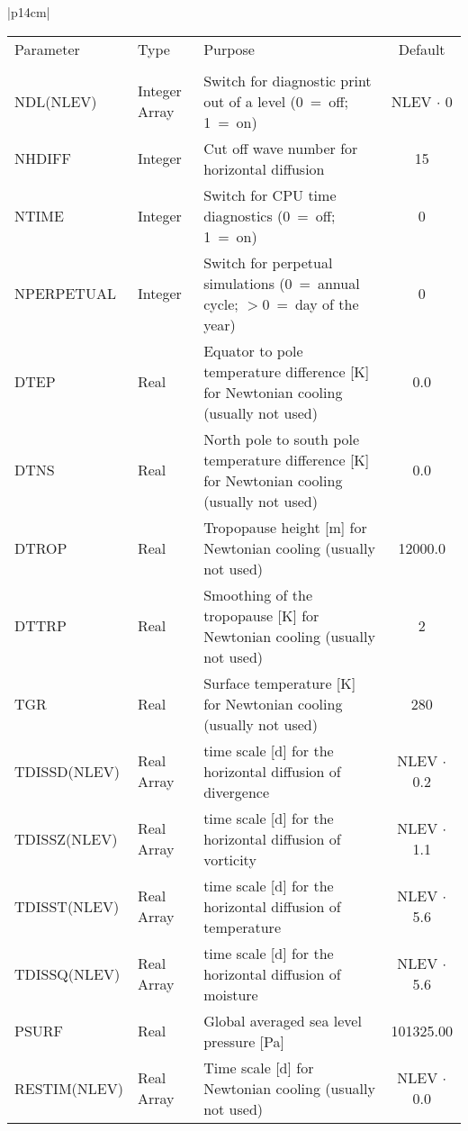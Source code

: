 \newpage 

\begin{center}
\begin{tabular}{|p{14cm}|}
\begin{center}
\begin{tabular}{l l p{5cm} c} %
Parameter & Type & Purpose & Default \\
&&&\\
NDL(NLEV) & Integer Array & Switch for diagnostic print out of a level (0~=~off; 1~=~on)
& NLEV $\cdot$ 0 \\
NHDIFF & Integer & Cut off wave number for horizontal diffusion &  15 \\
NTIME & Integer & Switch for CPU time diagnostics (0~=~off; 1~=~on) & 0 \\
NPERPETUAL & Integer & Switch for perpetual simulations (0~=~annual cycle;
$>$0~=~day
of the year) & 0 \\
DTEP & Real & Equator to pole temperature difference [K] for Newtonian cooling (usually
not used) & 0.0 \\ 
DTNS & Real & North pole to south pole temperature difference [K] for Newtonian cooling 
(usually not used) & 0.0 \\   
DTROP & Real & Tropopause height [m] for Newtonian cooling (usually not used) &
12000.0 \\  
DTTRP & Real & Smoothing of the tropopause [K] for Newtonian cooling (usually not used)
& 2 \\
TGR & Real & Surface temperature [K] for Newtonian cooling (usually not used) & 280 \\
TDISSD(NLEV) & Real Array & time scale [d] for the horizontal diffusion of divergence&
NLEV $\cdot$ 0.2 \\
 TDISSZ(NLEV) & Real Array & time scale [d] for the horizontal diffusion of vorticity&
NLEV $\cdot$ 1.1 \\
TDISST(NLEV) & Real Array & time scale [d] for the horizontal diffusion of temperature &
NLEV $\cdot$ 5.6 \\
TDISSQ(NLEV) & Real Array & time scale [d] for the horizontal diffusion of moisture&
NLEV $\cdot$ 5.6 \\
PSURF & Real & Global averaged sea level pressure [Pa] & 101325.00 \\
RESTIM(NLEV)  & Real Array & Time scale [d] for Newtonian cooling (usually not used)
& NLEV $\cdot$ 0.0 \\
\end{tabular}
\end{center}
\end{tabular}
\end{center}

